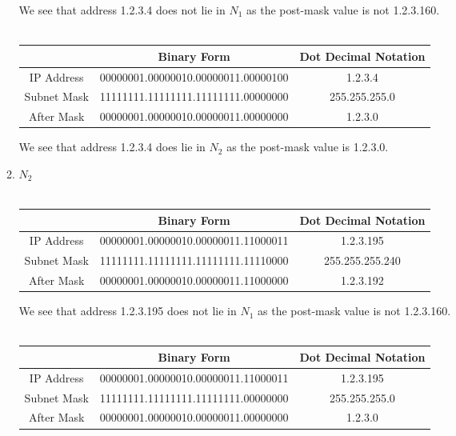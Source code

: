 \documentclass[12pt]{article}
\begin{document}
\begin{enumerate}
\begin{enumerate}
        We see that address 1.2.3.4 does not lie in $N_1$ as the post-mask value is not 1.2.3.160.\\ \\   
        \begin{tabular}{ |c|c|c| } 
         \hline
         & Binary Form & Dot Decimal Notation \\ 
         \hline
         IP Address & 00000001.00000010.00000011.00000100 & 1.2.3.4 \\ 
         Subnet Mask & 11111111.11111111.11111111.00000000 & 255.255.255.0 \\
         After Mask & 00000001.00000010.00000011.00000000 & 1.2.3.0 \\
         \hline
        \end{tabular}
        
        We see that address 1.2.3.4 does lie in $N_2$ as the post-mask value is 1.2.3.0. \\
        
        \item \underline{$N_2$}\\ \\
        \begin{tabular}{ |c|c|c| } 
         \hline
         & Binary Form & Dot Decimal Notation \\ 
         \hline
         IP Address & 00000001.00000010.00000011.11000011 & 1.2.3.195 \\ 
         Subnet Mask & 11111111.11111111.11111111.11110000 & 255.255.255.240 \\
         After Mask & 00000001.00000010.00000011.11000000 & 1.2.3.192 \\
         \hline
        \end{tabular}
        
        We see that address 1.2.3.195 does not lie in $N_1$ as the post-mask value is not 1.2.3.160.\\ \\
        \begin{tabular}{ |c|c|c| } 
         \hline
         & Binary Form & Dot Decimal Notation \\ 
         \hline
         IP Address & 00000001.00000010.00000011.11000011 & 1.2.3.195 \\ 
         Subnet Mask & 11111111.11111111.11111111.00000000 & 255.255.255.0 \\
         After Mask & 00000001.00000010.00000011.00000000 & 1.2.3.0 \\
         \hline
        \end{tabular}
        

\end{enumerate}
\end{enumerate}
\end{document}
